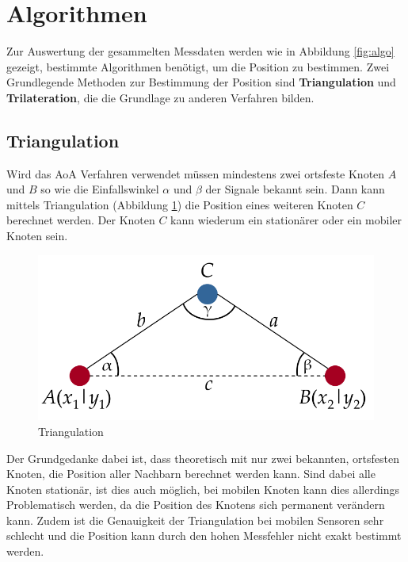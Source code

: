 \section{Algorithmen}
\label{sec:algorithmen}

Zur Auswertung der gesammelten Messdaten werden wie in Abbildung
\ref{fig:algo} gezeigt, bestimmte Algorithmen benötigt, um die
Position zu bestimmen. Zwei Grundlegende Methoden zur Bestimmung der
Position sind \textbf{Triangulation} und \textbf{Trilateration}, die
die Grundlage zu anderen Verfahren bilden.


\subsection{Triangulation}

Wird das \ac{AoA} Verfahren verwendet müssen mindestens zwei ortsfeste
Knoten $A$ und $B$ so wie die Einfallswinkel $\alpha$ und $\beta$ der
Signale bekannt sein. Dann kann mittels Triangulation (Abbildung
\ref{fig:triang}) die Position eines weiteren Knoten $C$ berechnet
werden. Der Knoten $C$ kann wiederum ein stationärer oder ein mobiler
Knoten sein.

\begin{figure}[h!]
  \centering
  \includegraphics[scale=0.3]{img/triang}

  \caption{Triangulation}
  \label{fig:triang}
\end{figure}

Der Grundgedanke dabei ist, dass theoretisch mit nur zwei bekannten,
ortsfesten Knoten, die Position aller Nachbarn berechnet werden kann.
Sind dabei alle Knoten stationär, ist dies auch möglich, bei mobilen
Knoten kann dies allerdings Problematisch werden, da die Position des
Knotens sich permanent verändern kann. Zudem ist die Genauigkeit der
Triangulation bei mobilen Sensoren sehr schlecht und die Position kann
durch den hohen Messfehler nicht exakt bestimmt werden.
\cite{roehrig2009} 

